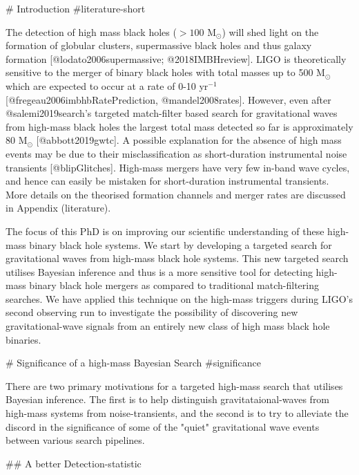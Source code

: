 # Introduction {#literature-short} 


The detection of high mass black holes ($>100$ M${}_\odot$) will shed light on the formation of globular clusters,
supermassive black holes and thus galaxy formation [@lodato2006supermassive; @2018IMBHreview]. LIGO is theoretically
sensitive to the merger of binary black holes with total masses up to 500 M${}_\odot$ which are expected to occur at a
rate of 0-10 yr$^{-1}$ [@fregeau2006imbhbRatePrediction, @mandel2008rates]. However, even after @salemi2019search's
targeted match-filter based search for gravitational waves from high-mass black holes the largest total mass detected so
far is approximately 80 M${}_\odot$ [@abbott2019gwtc]. A possible explanation for the absence of high mass events may be
due to their misclassification as short-duration instrumental noise transients [@blipGlitches]. High-mass mergers have
very few in-band wave cycles, and hence can easily be mistaken for short-duration instrumental transients. More details
on the theorised formation channels and merger rates are discussed in Appendix \@ref(literature).

The focus of this PhD is on improving our scientific understanding of these high-mass binary black hole systems. We
start by developing a targeted search for gravitational waves from high-mass black hole systems. This new targeted
search utilises Bayesian inference and thus is a more sensitive tool for detecting high-mass binary black hole mergers
as compared to traditional match-filtering searches. We have applied this technique on the high-mass triggers during
LIGO's second observing run to investigate the possibility of discovering new gravitational-wave signals from an
entirely new class of high mass black hole binaries.




# Significance of a high-mass Bayesian Search {#significance}

There are two primary motivations for a targeted high-mass search that utilises Bayesian inference. The first is to help
distinguish gravitataional-waves from high-mass systems from noise-transients, and the second is to try to alleviate the
discord in the significance of some of the "quiet" gravitational wave events between various search pipelines. 

## A better Detection-statistic

